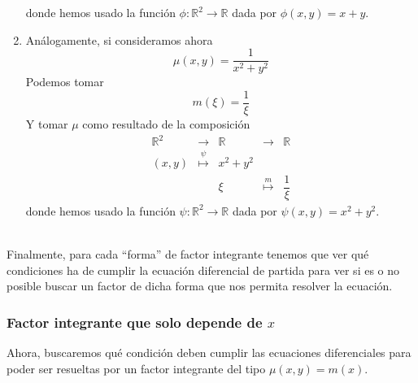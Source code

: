 \begin{ejemplo}
\begin{enumerate}
            donde hemos usado la función $\phi:\mathbb{R}^2\rightarrow\mathbb{R}$ dada por $\phi(x,y)=x+y$.
        \item Análogamente, si consideramos ahora 
            \begin{equation*}
                \mu(x,y) = \dfrac{1}{x^2+y^2}
            \end{equation*}
            Podemos tomar
            \begin{equation*}
                m(\xi) = \dfrac{1}{\xi}
            \end{equation*}
            Y tomar $\mu$ como resultado de la composición
            \begin{equation*}
                \begin{array}{ccccc}
                    \mathbb{R}^2 & \longrightarrow & \mathbb{R} & \longrightarrow & \mathbb{R}\\
                    (x,y) & \stackrel{\psi}{\longmapsto} & x^2+y^2 \\
                          & & \xi & \stackrel{m}{\longmapsto} & \dfrac{1}{\xi}
                \end{array}
            \end{equation*}
            donde hemos usado la función $\psi:\mathbb{R}^2\rightarrow\mathbb{R}$ dada por $\psi(x,y)=x^2+y^2$.
    \end{enumerate}
\end{ejemplo}~\\

Finalmente, para cada ``forma'' de factor integrante tenemos que ver qué condiciones ha de cumplir la ecuación diferencial de partida para ver si es o no posible buscar un factor de dicha forma que nos permita resolver la ecuación.

\subsubsection{Factor integrante que solo depende de $x$}
Ahora, buscaremos qué condición deben cumplir las ecuaciones diferenciales para poder ser resueltas por un factor integrante del tipo $\mu(x,y)=m(x)$.\\

